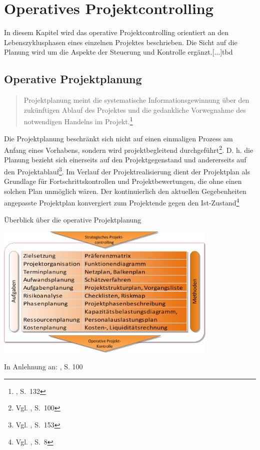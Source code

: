 \section{Operatives Projektcontrolling}
\label{sec:opc}
In diesem Kapitel wird das operative Projektcontrolling orientiert an den Lebenszyklusphasen eines einzelnen Projektes beschrieben. Die Sicht auf die Planung wird um die Aspekte der Steuerung und Kontrolle ergänzt.[...]tbd
\subsection{Operative Projektplanung}
\label{ssec:opp}
\begin{quote}
\glqq Projektplanung meint die systematische Informationsgewinnung über den zukünftigen Ablauf des Projektes und die gedankliche Vorwegnahme des notwendigen Handelns im Projekt.\grqq\footnote{\cite{Platz&Schmelzer1986}, S.~132}
\end{quote}
Die Projektplanung beschränkt sich nicht auf einen einmaligen Prozess am Anfang eines Vorhabens, sondern wird projektbegleitend durchgeführt\footnote{Vgl. \cite{Fiedler2008}, S.~100}. D. h. die Planung bezieht sich einerseits auf den Projektgegenstand und andererseits auf den Projektablauf\footnote{Vgl. \cite{Litke2007}, S.~153}. Im Verlauf der Projektrealisierung dient der Projektplan als Grundlage für Fortschrittskontrollen und Projektbewertungen, die ohne einen solchen Plan unmöglich wären. Der kontinuierlich den aktuellen Gegebenheiten angepasste Projektplan konvergiert zum Projektende gegen den Ist-Zustand\footnote{Vgl. \cite{Gubbels2006}, S.~8}
\begin{table}
\begin{center}
\caption[Überblick über die operative Projektplanung]{Überblick über die operative Projektplanung}

\includegraphics[width=0.8\textwidth]{Images/opPlanung.png}
\label{tbl1}

   {\footnotesize In Anlehnung an: \cite{Fiedler2008}, S. 100}
\end{center}

\end{table}

